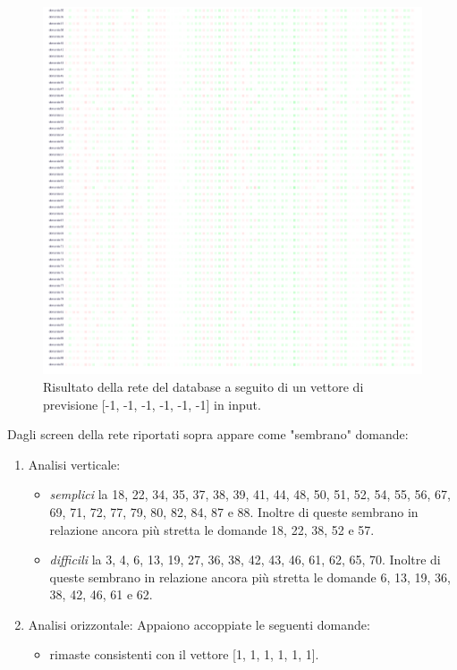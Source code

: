 \begin{itemize}
\begin{figure}[H]
\centering
	\includegraphics[width=0.90\linewidth]{./image/rete_db-vpmeno1_2.png}
	\caption{Risultato della rete del database a seguito di un vettore di previsione [-1, -1, -1, -1, -1, -1] in input.}
	\label{Risultato della rete del database a seguito di un vettore di previsione [-1, -1, -1, -1, -1, -1] in input.}
\end{figure}
\noindent
Dagli screen della rete riportati sopra appare come "sembrano" domande:
\begin{enumerate}
\item Analisi verticale:
\begin{itemize}
\item \textit{semplici} la 18, 22, 34, 35, 37, 38, 39, 41, 44, 48, 50, 51, 52, 54, 55, 56, 67, 69,  71, 72, 77, 79, 80, 82, 84, 87 e 88. Inoltre di queste sembrano in relazione ancora pi\`u stretta le domande 18, 22, 38, 52 e 57.
\item \textit{difficili} la 3, 4, 6, 13, 19, 27, 36, 38, 42, 43, 46, 61, 62, 65, 70. Inoltre di queste sembrano in relazione ancora pi\`u stretta le domande 6, 13, 19, 36, 38, 42, 46, 61 e 62.
\end{itemize}
\item Analisi orizzontale:
Appaiono accoppiate le seguenti domande:
\begin{itemize}
\item rimaste consistenti con il vettore [1, 1, 1, 1, 1, 1].
\end{itemize}
\end{enumerate}



\end{itemize}
